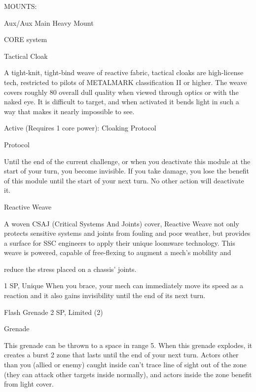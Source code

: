                                                     MOUNTS: 

 Aux/Aux                             Main                                   Heavy Mount 

                                                 CORE system 

                                                 Tactical Cloak  

 A tight-knit, tight-bind weave of reactive fabric, tactical cloaks are high-license tech, restricted to pilots  
  of METALMARK classification II or higher. The weave covers roughly 80%
  overall dull quality when viewed through optics or with the naked eye. It is difficult to target, and when  
 activated it bends light in such a way that makes it nearly impossible to see.   

 Active (Requires 1 core power):  
  Cloaking Protocol
 
  Protocol
 
  Until the end of the current challenge, or when you deactivate this module at the start of your turn, you  
  become invisible. If you take damage, you lose the benefit of this module until the start of your next  
  turn. No other action will deactivate it. 

Reactive Weave  

A woven CSAJ (Critical Systems And Joints) cover, Reactive Weave not only protects sensitive systems and  
joints from fouling and poor weather, but provides a surface for SSC engineers to apply their unique  
loomware technology. This weave is powered, capable of free-flexing to augment a mech’s mobility and  

reduce the stress placed on a chassis’ joints.   

                                                                                                                


1 SP, Unique  
When you brace, your mech can immediately move its speed as a reaction and it also gains  
invisibility until the end of its next turn.
 

Flash Grenade  
2 SP, Limited (2)
 
Grenade
 

This grenade can be thrown to a space in range 5. When this grenade explodes, it creates a  
burst 2 zone that lasts until the end of your next turn. Actors other than you (allied or enemy)  
caught inside can’t trace line of sight out of the zone (they can attack other targets inside  
normally), and actors inside the zone benefit from light cover.
 

